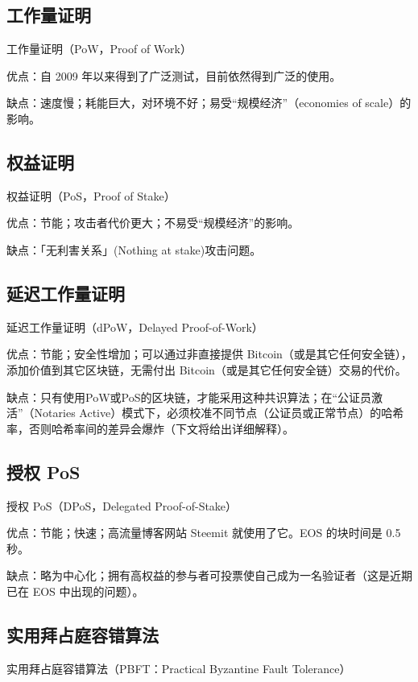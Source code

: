 \subsection{工作量证明}

工作量证明（PoW，Proof of Work）

优点：自 2009 年以来得到了广泛测试，目前依然得到广泛的使用。

缺点：速度慢；耗能巨大，对环境不好；易受“规模经济”（economies of scale）的影响。

\subsection{权益证明}

权益证明（PoS，Proof of Stake）

优点：节能；攻击者代价更大；不易受“规模经济”的影响。

缺点：「无利害关系」(Nothing at stake)攻击问题。

\subsection{延迟工作量证明}

延迟工作量证明（dPoW，Delayed Proof-of-Work）

优点：节能；安全性增加；可以通过非直接提供 Bitcoin（或是其它任何安全链），添加价值到其它区块链，无需付出 Bitcoin（或是其它任何安全链）交易的代价。

缺点：只有使用PoW或PoS的区块链，才能采用这种共识算法；在“公证员激活”（Notaries Active）模式下，必须校准不同节点（公证员或正常节点）的哈希率，否则哈希率间的差异会爆炸（下文将给出详细解释）。

\subsection{授权 PoS}

授权 PoS（DPoS，Delegated Proof-of-Stake）

优点：节能；快速；高流量博客网站 Steemit 就使用了它。EOS 的块时间是 0.5 秒。

缺点：略为中心化；拥有高权益的参与者可投票使自己成为一名验证者（这是近期已在 EOS 中出现的问题）。

\subsection{实用拜占庭容错算法}

实用拜占庭容错算法（PBFT：Practical Byzantine Fault Tolerance）

